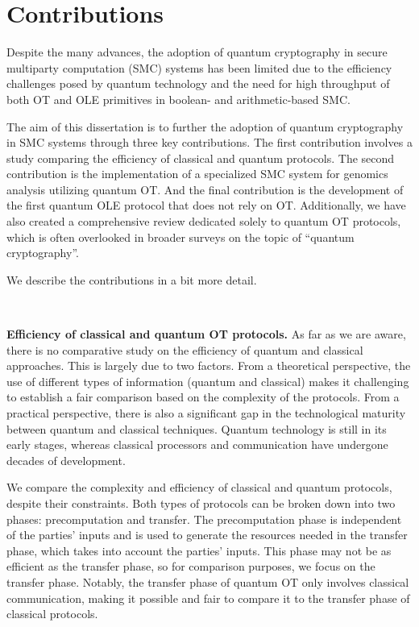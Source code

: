 \section*{Contributions} %

Despite the many advances, the adoption of quantum cryptography in secure multiparty computation (SMC) systems has been limited due to the efficiency challenges posed by quantum technology and the need for high throughput of both OT and OLE primitives in boolean- and arithmetic-based SMC.

The aim of this dissertation is to further the adoption of quantum cryptography in SMC systems through three key contributions. The first contribution involves a study comparing the efficiency of classical and quantum protocols. The second contribution is the implementation of a specialized SMC system for genomics analysis utilizing quantum OT. And the final contribution is the development of the first quantum OLE protocol that does not rely on OT. Additionally, we have also created a comprehensive review dedicated solely to quantum OT protocols, which is often overlooked in broader surveys on the topic of ``quantum cryptography''.

We describe the contributions in a bit more detail.

\

\noindent\textbf{Efficiency of classical and quantum OT protocols.} As far as we are aware, there is no comparative study on the efficiency of quantum and classical approaches. This is largely due to two factors. From a theoretical perspective, the use of different types of information (quantum and classical) makes it challenging to establish a fair comparison based on the complexity of the protocols. From a practical perspective, there is also a significant gap in the technological maturity between quantum and classical techniques. Quantum technology is still in its early stages, whereas classical processors and communication have undergone decades of development.


We compare the complexity and efficiency of classical and quantum protocols, despite their constraints. Both types of protocols can be broken down into two phases: precomputation and transfer. The precomputation phase is independent of the parties' inputs and is used to generate the resources needed in the transfer phase, which takes into account the parties' inputs. This phase may not be as efficient as the transfer phase, so for comparison purposes, we focus on the transfer phase. Notably, the transfer phase of quantum OT only involves classical communication, making it possible and fair to compare it to the transfer phase of classical protocols.


